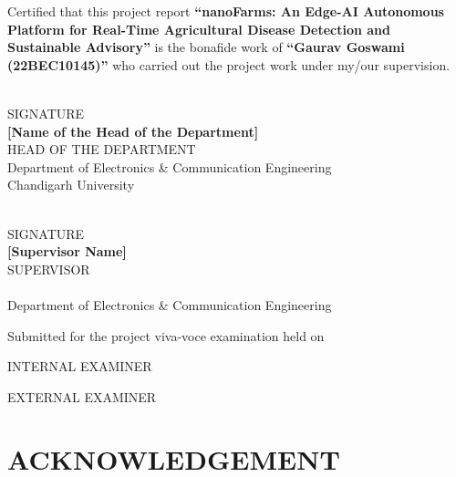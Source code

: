 \documentclass[12pt,oneside]{report}
\begin{document}
\fontsize{14}{17}\selectfont

Certified that this project report \textbf{``nanoFarms: An Edge-AI Autonomous Platform for Real-Time Agricultural Disease Detection and Sustainable Advisory''} is the bonafide work of \textbf{``Gaurav Goswami (22BEC10145)''} who carried out the project work under my/our supervision.

\vspace{2cm}

\begin{minipage}[t]{0.45\textwidth}
\centering
\underline{\hspace{5cm}}\\
SIGNATURE\\[0.3cm]
\textbf{[Name of the Head of the Department]}\\
HEAD OF THE DEPARTMENT\\
Department of Electronics \& Communication Engineering\\
Chandigarh University
\end{minipage}
\hfill
\begin{minipage}[t]{0.45\textwidth}
\centering
\underline{\hspace{5cm}}\\
SIGNATURE\\[0.3cm]
\textbf{[Supervisor Name]}\\
SUPERVISOR\\
[Academic Designation]\\
Department of Electronics \& Communication Engineering
\end{minipage}

\vspace{2cm}

Submitted for the project viva-voce examination held on \underline{\hspace{4cm}}

\vspace{2cm}

\begin{minipage}[t]{0.45\textwidth}
\centering
INTERNAL EXAMINER
\end{minipage}
\hfill
\begin{minipage}[t]{0.45\textwidth}
\centering
EXTERNAL EXAMINER
\end{minipage}

\clearpage

\chapter*{ACKNOWLEDGEMENT}
\fontsize{12}{18}\selectfont
\end{document}

